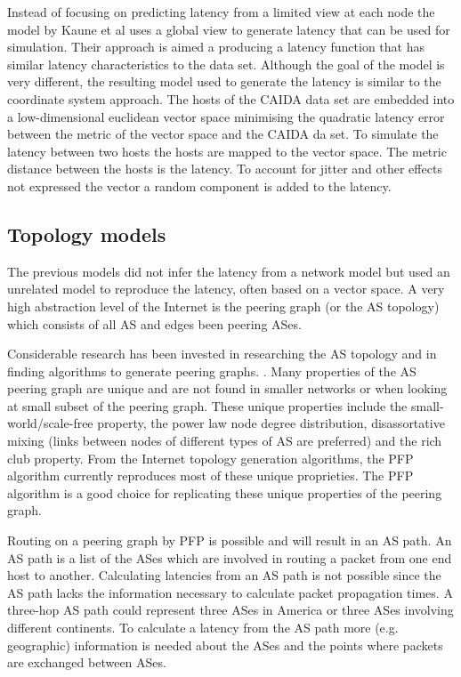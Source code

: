 \documentclass{sig-alternate-10pt}
\begin{document}
Instead of focusing on predicting latency from a limited view at each node the model  by Kaune et al \cite{modelidelay} uses a global view to generate latency that can be used for simulation. Their approach is aimed a producing a latency function that has similar latency characteristics to the data set. Although the goal of the model is very different, the resulting model used to generate the latency is similar to the coordinate system approach. 
The hosts of the CAIDA data set are embedded into a low-dimensional euclidean vector space minimising the quadratic latency error between the metric of the vector space and the CAIDA da set.
To simulate the latency between two hosts the hosts are mapped to the vector space. The metric distance between the hosts is the latency. To account for jitter and other effects not expressed the vector a random component is added to the latency.

\subsection{Topology models}
\label{sec:topology-models}

The previous models did not infer the latency from a network model but used an unrelated model to reproduce the latency, often based on a vector space. A very high abstraction level of the Internet is the peering graph (or the AS topology) which consists of all AS and edges been peering ASes.

Considerable research has been invested in researching the AS topology and in finding algorithms to generate peering graphs. \cite{netgensurvey}. Many properties of the AS peering graph are unique and  are not found in smaller networks or when looking at small subset of the peering graph. 
 These unique properties include the small-world/scale-free property, the power law node degree distribution, disassortative mixing (links between nodes of different types of AS are preferred) \cite{largescaleinet} and the rich club \cite{richclub} property. From the Internet topology generation algorithms, the PFP \cite{pfp} algorithm currently reproduces most of these unique proprieties. The PFP algorithm is a good choice for replicating these unique properties of the peering graph. 

Routing on a peering graph by PFP is possible and will result in an AS path. An AS path is a list of the ASes which are involved in routing a packet from one end host to another.
Calculating latencies from an AS path is not possible since the AS path lacks the information necessary to calculate packet propagation times. A three-hop AS path could represent three ASes in America or three ASes involving different continents. 
To calculate a latency from the AS path more (e.g. geographic) information is needed about the ASes and the points where packets are exchanged between ASes.
\end{document}
